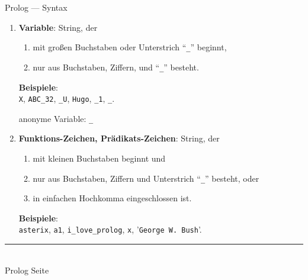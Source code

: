 \documentclass{slides}
\newcommand{\myrule}{\rule{20cm}{1mm}\\ }
\newcounter{mypage}
\begin{document}
\begin{slide}{}
\normalsize
\begin{center}
Prolog --- Syntax
\end{center}
\vspace{0.5cm}

\footnotesize
\begin{enumerate}
\item \textbf{Variable}: String, der 
      \begin{enumerate}
      \item mit großen Buchstaben oder Unterstrich ``\texttt{\_}'' beginnt,
      \item nur aus Buchstaben, Ziffern, und ``\texttt{\_}'' besteht.
      \end{enumerate}
      \textbf{Beispiele}: 
      \\[0.3cm]
      \hspace*{1.3cm} \texttt{X}, \texttt{ABC\_32}, \texttt{\_U}, \texttt{Hugo},
      \texttt{\_1}, \texttt{\_}.
      
      anonyme Variable: \texttt{\_}
\item \textbf{Funktions-Zeichen, Pr\"{a}dikats-Zeichen}: String, der
      \begin{enumerate}
      \item mit kleinen Buchstaben beginnt und 
      \item nur aus Buchstaben, Ziffern und Unterstrich ``\texttt{\_}'' besteht, oder
      \item in einfachen Hochkomma eingeschlossen ist.
      \end{enumerate}
      \textbf{Beispiele}:
      \\[0.3cm]
      \hspace*{1.3cm}      
      \texttt{asterix}, \texttt{a1}, \texttt{i\_love\_prolog}, \texttt{x}, '\texttt{George W. Bush}'.
\end{enumerate}


\vspace*{\fill}
\tiny \addtocounter{mypage}{1}
\myrule
Prolog  \hspace*{\fill} Seite 
\end{slide}
\end{document}
